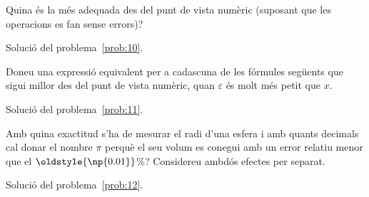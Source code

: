 \documentclass[a4paper,twoside,12pt]{exam}
\newcommand{\osnp}[1]{\oldstyle{\np{#1}}}
\begin{document}
\begin{questions}
Quina és la més adequada des del punt de vista numèric (suposant que
les operacions es fan sense errors)?
\begin{solution}
	Solució del problema~\ref{prob:10}.
\end{solution}

\question\label{prob:11}
Doneu una expressió equivalent per a cadascuna de les fórmules següents
que sigui millor des del punt de vista numèric, quan $\varepsilon$ és
molt més petit que $x$.
\begin{solution}
	Solució del problema~\ref{prob:11}. 
\end{solution}

\question\label{prob:12}
Amb quina exactitud s'ha de mesurar el radi d'una esfera i amb quants 
decimals cal donar el nombre $\pi$ perquè el seu volum es conegui amb 
un error relatiu menor que el $\osnp{0.01}$\%? Considereu ambdós 
efectes per separat.
\begin{solution}
	Solució del problema~\ref{prob:12}.
\end{solution}
\end{questions}
\end{document}
